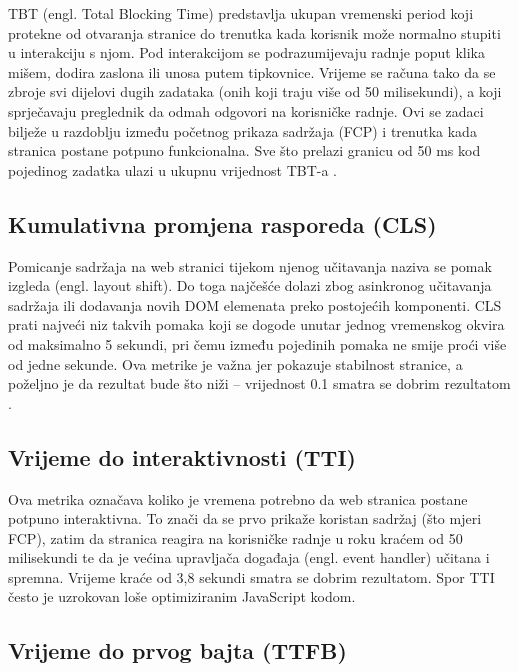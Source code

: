 TBT (engl. Total Blocking Time) predstavlja ukupan vremenski period koji protekne od otvaranja stranice do trenutka kada korisnik može normalno stupiti u interakciju s njom. Pod interakcijom se podrazumijevaju radnje poput klika mišem, dodira zaslona ili unosa putem tipkovnice. Vrijeme se računa tako da se zbroje svi dijelovi dugih zadataka (onih koji traju više od 50 milisekundi), a koji sprječavaju preglednik da odmah odgovori na korisničke radnje. Ovi se zadaci bilježe u razdoblju između početnog prikaza sadržaja (FCP) i trenutka kada stranica postane potpuno funkcionalna. Sve što prelazi granicu od 50 ms kod pojedinog zadatka ulazi u ukupnu vrijednost TBT-a \cite{nordstrom2023comparison}.

\subsection{Kumulativna promjena rasporeda (CLS)}

Pomicanje sadržaja na web stranici tijekom njenog učitavanja naziva se  pomak izgleda (engl. layout shift). Do toga najčešće dolazi zbog asinkronog učitavanja sadržaja ili dodavanja novih DOM elemenata preko postojećih komponenti. CLS prati najveći niz takvih pomaka koji se dogode unutar jednog vremenskog okvira od maksimalno 5 sekundi, pri čemu između pojedinih pomaka ne smije proći više od jedne sekunde. Ova metrike je važna jer pokazuje stabilnost stranice, a poželjno je da rezultat bude što niži – vrijednost 0.1 smatra se dobrim rezultatom \cite{nordstrom2023comparison}.

\subsection{Vrijeme do interaktivnosti (TTI)}

Ova metrika označava koliko je vremena potrebno da web stranica postane potpuno interaktivna. To znači da se prvo prikaže koristan sadržaj (što mjeri FCP), zatim da stranica reagira na korisničke radnje u roku kraćem od 50 milisekundi te da je većina upravljača događaja (engl. event handler) učitana i spremna. Vrijeme kraće od 3,8 sekundi smatra se dobrim rezultatom. Spor TTI često je uzrokovan loše optimiziranim JavaScript kodom. \cite{nordstrom2023comparison}

\subsection{Vrijeme do prvog bajta (TTFB)}

